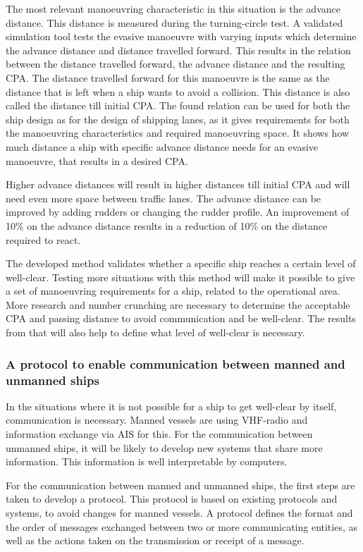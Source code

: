 The most relevant manoeuvring characteristic in this situation is the advance distance. This distance is measured during the turning-circle test. A validated simulation tool tests the evasive manoeuvre with varying inputs which determine the advance distance and distance travelled forward. This results in the relation between the distance travelled forward, the advance distance and the resulting CPA.
The distance travelled forward for this manoeuvre is the same as the distance that is left when a ship wants to avoid a collision. This distance is also called the distance till initial CPA.
The found relation can be used for both the ship design as for the design of shipping lanes, as it gives requirements for both the manoeuvring characteristics and required manoeuvring space. It shows how much distance a ship with specific advance distance needs for an evasive manoeuvre, that results in a desired CPA.

Higher advance distances will result in higher distances till initial CPA and will need even more space between traffic lanes. The advance distance can be improved by adding rudders or changing the rudder profile. An improvement of 10\% on the advance distance results in a reduction of 10\% on the distance required to react.

The developed method validates whether a specific ship reaches a certain level of well-clear. Testing more situations with this method will make it possible to give a set of manoeuvring requirements for a ship, related to the operational area. 
More research and number crunching are necessary to determine the acceptable \ac{CPA} and passing distance to avoid communication and be well-clear. The results from that will also help to define what level of well-clear is necessary.

\subsubsection{A protocol to enable communication between manned and unmanned ships}
\noindent In the situations where it is not possible for a ship to get well-clear by itself, communication is necessary. Manned vessels are using VHF-radio and information exchange via AIS for this. For the communication between unmanned ships, it will be likely to develop new systems that share more information. This information is well interpretable by computers. 

For the communication between manned and unmanned ships, the first steps are taken to develop a protocol. This protocol is based on existing protocols and systems, to avoid changes for manned vessels. A protocol defines the format and the order of messages exchanged between two or more communicating entities, as well as the actions taken on the transmission or receipt of a message. 


